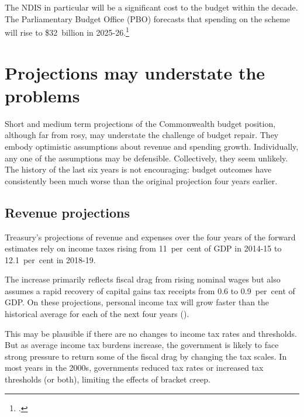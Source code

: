 \documentclass[twoside,english]{palatinob5portrait}
\begin{document}
The NDIS in particular will be a significant cost to the budget within the decade. The Parliamentary Budget Office (PBO) forecasts that spending on the scheme will rise to \$32~billion in 2025-26.\footcite[][5]{PBO2015} 

\section{Projections may understate the problems\label{sec:FISCAL-3-3}}
Short and medium term projections of the Commonwealth budget position, although far from rosy, may understate the challenge of budget repair. They embody optimistic assumptions about revenue and spending growth. Individually, any one of the assumptions may be defensible. Collectively, they seem unlikely. The history of the last six years is not encouraging: budget outcomes have consistently been much worse than the original projection four years earlier.

\subsection{Revenue projections}
Treasury’s projections of revenue and expenses over the four years of the forward estimates rely on income taxes rising from 11~per~cent of GDP in 2014-15 to 12.1~per~cent in 2018-19. 

The increase primarily reflects fiscal drag from rising nominal wages but also assumes a rapid recovery of capital gains tax receipts from 0.6 to 0.9~per~cent of GDP\@. On these projections, personal income tax will grow faster than the historical average for each of the next four years ().

This may be plausible if there are no changes to income tax rates and thresholds. But as average income tax burdens increase, the government is likely to face strong pressure to return some of the fiscal drag by changing the tax scales. In most years in the 2000s, governments reduced tax rates or increased tax thresholds (or both), limiting the effects of bracket creep. 
\end{document}
